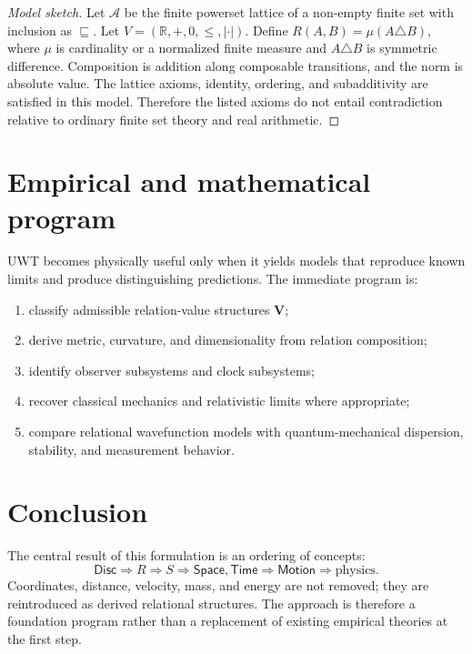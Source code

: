 \documentclass[11pt,a4paper]{article}
\theoremstyle{definition}
\theoremstyle{plain}
\theoremstyle{remark}
\newcommand{\Parts}{\mathcal A}
\newcommand{\Rel}{R}
\newcommand{\Values}{V}
\newcommand{\Vstruct}{\mathbf V}
\newcommand{\State}{S}
\newcommand{\PartOf}{\sqsubseteq}
\newcommand{\Disc}{\mathsf{Disc}}
\newcommand{\Space}{\mathsf{Space}}
\newcommand{\Time}{\mathsf{Time}}
\newcommand{\Motion}{\mathsf{Motion}}
\begin{document}
\begin{proof}[Model sketch]
Let \(\Parts\) be the finite powerset lattice of a non-empty finite set with
inclusion as \(\PartOf\). Let \(\Values=(\mathbb R,+,0,\leq,|\cdot|)\). Define
\(\Rel(A,B)=\mu(A\triangle B)\), where \(\mu\) is cardinality or a normalized
finite measure and \(A\triangle B\) is symmetric difference. Composition is
addition along composable transitions, and the norm is absolute value. The
lattice axioms, identity, ordering, and subadditivity are satisfied in this
model. Therefore the listed axioms do not entail contradiction relative to
ordinary finite set theory and real arithmetic.
\end{proof}

\section{Empirical and mathematical program}

UWT becomes physically useful only when it yields models that reproduce known
limits and produce distinguishing predictions. The immediate program is:
\begin{enumerate}[label=(\roman*)]
  \item classify admissible relation-value structures \(\Vstruct\);
  \item derive metric, curvature, and dimensionality from relation composition;
  \item identify observer subsystems and clock subsystems;
  \item recover classical mechanics and relativistic limits where appropriate;
  \item compare relational wavefunction models with quantum-mechanical
        dispersion, stability, and measurement behavior.
\end{enumerate}

\section{Conclusion}

The central result of this formulation is an ordering of concepts:
\[
\Disc \Rightarrow \Rel \Rightarrow \State \Rightarrow \Space,\Time
\Rightarrow \Motion \Rightarrow \text{physics}.
\]
Coordinates, distance, velocity, mass, and energy are not removed; they are
reintroduced as derived relational structures. The approach is therefore a
foundation program rather than a replacement of existing empirical theories at
the first step.
\end{document}
